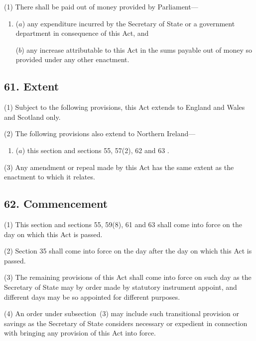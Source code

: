 \documentclass[12pt,a4paper]{article}
\begin{document}
(1) There shall be paid out of money provided by Parliament—
\begin{enumerate}\item[]
($a$) any expenditure incurred by the Secretary of State or a government department in consequence of this Act, and

($b$) any increase attributable to this Act in the sums payable out of money so provided under any other enactment.
\end{enumerate}


\subsection{61. Extent}

(1) Subject to the following provisions, this Act extends to England and Wales and Scotland only.

(2) The following provisions also extend to Northern Ireland---
\begin{enumerate}\item[]
($a$) this section and sections 55, 57(2), 62 and 63%
%
.
\end{enumerate}

(3) Any amendment or repeal made by this Act has the same extent as the enactment to which it relates.


\subsection{62. Commencement}

(1) This section and sections 55, 59(8), 61 and 63 shall come into force on the day on which this Act is passed.

(2) Section 35 shall come into force on the day after the day on which this Act is passed.

(3) The remaining provisions of this Act shall come into force on such day as the Secretary of State may by order made by statutory instrument appoint, and different days may be so appointed for different purposes.

(4) An order under subsection~(3) may include such transitional provision or savings as the Secretary of State considers necessary or expedient in connection with bringing any provision of this Act into force.
\end{document}
